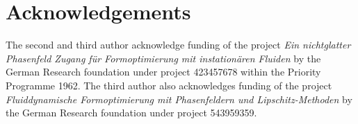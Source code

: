 \documentclass[a4paper,10pt]{article}
\theoremstyle{plain}
\theoremstyle{plain}
\numberwithin{equation}{section}
\begin{document}
\section*{Acknowledgements}
The second and third author acknowledge funding of the project {\it 
Ein nichtglatter Phasenfeld Zugang für Formoptimierung mit instationären Fluiden} by the German Research foundation under project 423457678 within the Priority Programme 1962. The third author also acknowledges funding of the project {\it 
Fluiddynamische Formoptimierung mit Phasenfeldern und Lipschitz-Methoden} by the German Research foundation under project 543959359.

\vspace{\baselineskip}











\end{document}
